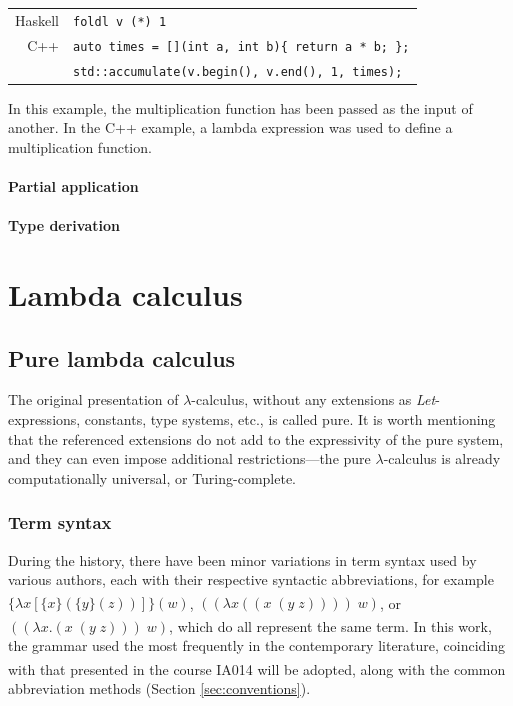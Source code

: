 \documentclass[table, a4paper, 10pt]{article}
\newcommand{\cit}[1]{\textsuperscript{\cite{#1}}}
\begin{document}
\vspace{2.4mm}
\hspace{8mm}
\begin{tabular}{rl}
       Haskell & \texttt{foldl v (*) 1}\\
            C++& \texttt{auto times = [](int a, int b)\{ return a * b; \};}\\
               & \texttt{std::accumulate(v.begin(), v.end(), 1, times);}
\end{tabular}

\noindent
In this example, the multiplication function has been passed as
the input of another. In the C++ example, a lambda
expression was used to define a multiplication function.

\paragraph{Partial application}

\paragraph{Type derivation}

\newpage 
\section{Lambda calculus}
\subsection{Pure lambda calculus}
The original presentation of $\lambda$-calculus, without any extensions as \textit{Let}-expressions,
constants, type systems, etc., is called pure. It is worth mentioning that the referenced extensions
do not add to the expressivity of the pure system, and they can even 
impose additional restrictions---the pure $\lambda$-calculus is already computationally universal, or Turing-complete.

\subsubsection{Term syntax}
During the history, there have been minor variations in term syntax
used by various authors, each with their respective
syntactic abbreviations, for example
$\{\lambda x[\{x\}(\{y\} (z))]\}(w)$,\cit{churchPaper}
$((\lambda x((x\;(y\;z))))\;w)$,\cit{zlatuska} or
$((\lambda x.(x\;(y\;z)))\;w)$,\cit{hudak} which do all
represent the same term. In this work, the grammar used the most
frequently in the contemporary literature, coinciding with that
presented in the course IA014\cit{slides} will be adopted, along with the common
abbreviation methods (Section \ref{sec:conventions}).
\end{document}
